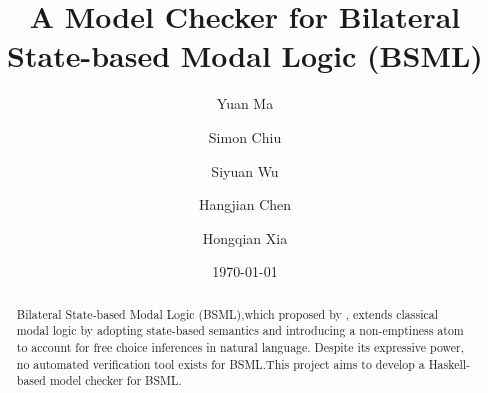 \documentclass[12pt,a4paper]{article}
\title{A Model Checker for Bilateral State-based Modal Logic (BSML)}
\author{Yuan Ma \and Simon Chiu \and Siyuan Wu \and Hangjian Chen \and Hongqian Xia}
\date{\today}
\begin{document}
\maketitle

\begin{abstract}

    Bilateral State-based Modal Logic (BSML),which proposed by \citet{Aloni2024}, extends classical modal logic by adopting state-based semantics and introducing a non-emptiness atom to account for free choice inferences in natural language. Despite its expressive power, no automated verification tool exists for BSML.\@ This project aims to develop a Haskell-based model checker for BSML.\@ 

\end{abstract}


\tableofcontents

\clearpage





















\end{document}
